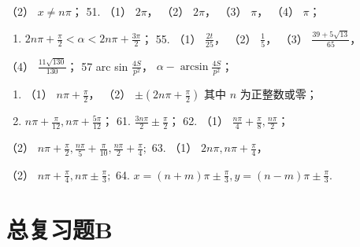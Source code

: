 （2） \(x \neq n\pi\)； 51. （1） \(2\pi\)， （2） \(2\pi\)， （3）
\(\pi\)， （4） \(\pi\)；

\begin{enumerate}[start=53]
\item
  \(2n\pi + \frac{\pi}{2} < \alpha < 2n\pi + \frac{3\pi}{2}\)； 55.
  （1） \(\frac{2t}{25}\)， （2） \(\frac{1}{5}\)， （3）
  \(\frac{39 + 5\sqrt{13}}{65}\)，
\end{enumerate}

（4） \(\frac{11\sqrt{130}}{130}\)； 57 arc sin \(\frac{4S}{p^2}\)，
\(\alpha - \arcsin \frac{4S}{p^2}\)；

\begin{enumerate}[start=59]
\item
  （1） \(n\pi + \frac{\pi}{2}\)， （2）
  \(\pm \left(2n\pi + \frac{\pi}{2}\right)\) 其中 \(n\) 为正整数或零；
\item
  \(n\pi + \frac{\pi}{12}, n\pi + \frac{5\pi}{12}\)； 61.
  \(\frac{3n\pi}{2} \pm \frac{\pi}{2}\)； 62. （1）
  \(\frac{n\pi}{4} + \frac{\pi}{8}, \frac{n\pi}{2}\)；
\end{enumerate}

（2）
\(n\pi + \frac{\pi}{2}, \frac{n\pi}{5} + \frac{\pi}{10}, \frac{n\pi}{2} + \frac{\pi}{4};\)
63. （1） \(2n\pi, n\pi + \frac{\pi}{4}\)，

（2） \(n\pi + \frac{\pi}{4}, n\pi \pm \frac{\pi}{3};\) 64.
\(x = (n + m)\pi \pm \frac{\pi}{3}, y = (n - m)\pi \pm \frac{\pi}{3}\).

\section{总复习题B}

